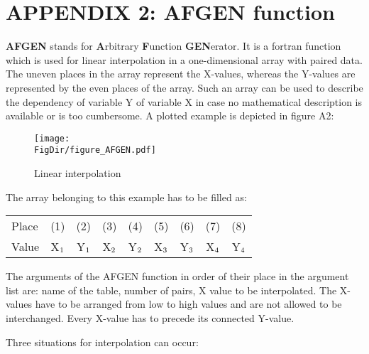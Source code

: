 \chapter{APPENDIX 2: AFGEN function} 
\label{app:AFGEN}

{\bf AFGEN} stands for {\bf A}rbitrary {\bf F}unction {\bf GEN}erator. It is a fortran function 
which is used for
linear interpolation in a one-dimensional array with paired data. The uneven places in the
array represent the X-values, whereas the Y-values are represented by the even places of the
array. Such an array can be used to describe the dependency of variable Y of variable X in
case no mathematical description is available or is too cumbersome. A plotted example is
depicted in figure A2:

\begin{figure}[htbp]
 \centering
     \texttt{[image: \\FigDir/figure\_AFGEN.pdf]}
 \caption{Linear interpolation}
 \label{fig:afgen}    
\end{figure}

The array belonging to this example has to be filled as:\\

\begin{center}
\begin{tabular}{lcccccccc}
Place & (1)& (2)& (3)& (4)& (5)& (6)& (7)& (8)\\
Value & X$_{{\rm 1}}$ & Y$_{{\rm 1}}$   & X$_{{\rm 2}}$& Y$_{{\rm 2}}$   & X$_{{\rm 3}}$ & Y$_{{\rm 3}}$   & X$_{{\rm 4}}$ & Y$_{{\rm 4}}$\\
\end{tabular}
\end{center}

The arguments of the AFGEN function in order of their place in the argument list are: name
of the table, number of pairs, X value to be interpolated. The X-values have to be arranged
from low to high values and are not allowed to be interchanged. Every X-value has to
precede its connected Y-value.

Three situations for interpolation can occur:

